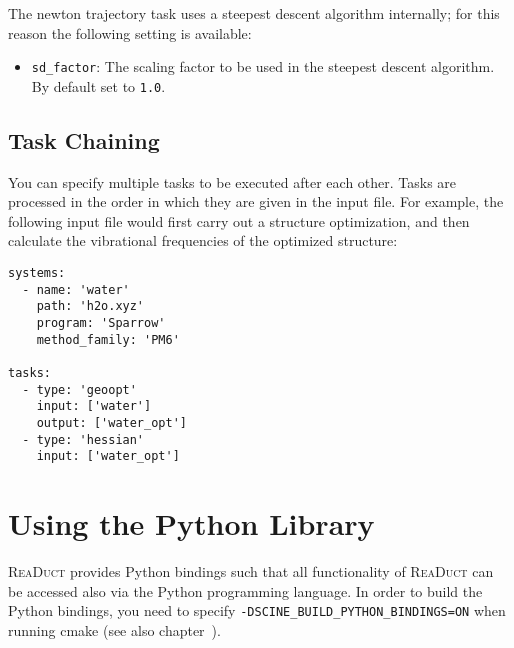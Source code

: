 \documentclass[]{tufte-book}
\begin{document}
The newton trajectory task uses a steepest descent algorithm internally; for this reason the following setting is available:
\begin{itemize}
\item \texttt{sd\_factor}: The scaling factor to be used in the steepest descent algorithm. By default set to \texttt{1.0}.
\end{itemize}

\section{Task Chaining}
\label{sec:task_chaining}

You can specify multiple tasks to be executed after each other. Tasks are processed in the order in which they are given in
the input file. For example, the following input file would first carry out a structure optimization, and then calculate
the vibrational frequencies of the optimized structure:

\begin{verbatim}
systems:
  - name: 'water'
    path: 'h2o.xyz'
    program: 'Sparrow'
    method_family: 'PM6'

tasks:
  - type: 'geoopt'
    input: ['water']
    output: ['water_opt']
  - type: 'hessian'
    input: ['water_opt']
\end{verbatim}



\chapter{Using the Python Library}

\textsc{ReaDuct} provides Python bindings such that all functionality of \textsc{ReaDuct} can be accessed also via the
Python programming language. In order to build the Python bindings, you need to specify \texttt{-DSCINE\_BUILD\_PYTHON\_BINDINGS=ON}
when running cmake (see also chapter~).
\end{document}
